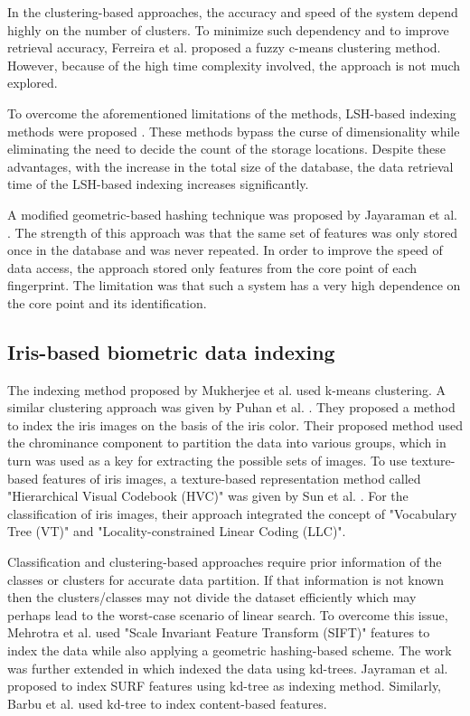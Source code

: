 In the clustering-based approaches, the accuracy and speed of the system depend highly 
on the number of clusters. 
To minimize such dependency and to improve
retrieval accuracy, Ferreira et al. \cite{Ferreira2015} proposed a fuzzy c-means clustering method. 
However, because of the high time complexity involved, the approach is not much explored.

To overcome the aforementioned limitations of the methods, 
LSH-based indexing methods were proposed \cite{Cappelli2011, Cappelli2012}. 
These methods bypass the curse of dimensionality while 
eliminating the need to decide the count of the storage locations.
Despite these advantages, 
with the increase in the total size of the database,
the data retrieval time of the LSH-based indexing increases significantly.

A modified geometric-based hashing technique was proposed by Jayaraman et al. \cite{Jayaraman2014}.
The strength of this approach was that the same set of features was only stored once in the database and was never repeated.
In order to improve the speed of data access, the approach stored only features from the core point of each fingerprint.
The limitation was that such a system has a very high dependence on the core point and its identification.


\subsection{Iris-based biometric data indexing}
The indexing method proposed by Mukherjee et al. \cite{Mukherjee2008iris} 
used k-means clustering. 
A similar clustering approach was given by Puhan et al. \cite{Puhan2008iris}. 
They proposed a method to index the iris images on the basis of the iris color. 
Their proposed method used the chrominance component to partition the data into various groups,
which in turn was used as a key for extracting the possible sets of images. 
To use texture-based features of iris images, a texture-based representation method called "Hierarchical Visual Codebook
(HVC)" was given by Sun et al. \cite{Sun2014iris}.
For the classification of iris images, their approach integrated the
concept of "Vocabulary Tree (VT)" and "Locality-constrained Linear Coding (LLC)".

Classification and clustering-based approaches require prior information of
the classes or clusters for accurate data partition.
If that information is not known then the clusters/classes may not divide the dataset efficiently which may perhaps lead to the worst-case scenario of linear search.
To overcome this issue, 
Mehrotra et al. \cite{Mehrotra2010iris}
used "Scale Invariant Feature Transform (SIFT)"
features to index the data while also applying a geometric hashing-based scheme. 
The work was further extended in \cite{Mehrotra2013iris} which indexed the
data using kd-trees.
Jayraman et al. \cite{Jayaraman2012iris} proposed to index SURF features using kd-tree as indexing method.
Similarly,  Barbu et al. \cite{Barbu2015iris} used kd-tree to index content-based features.

